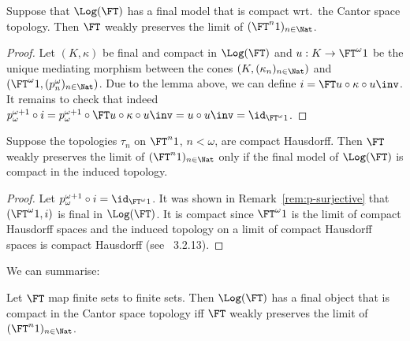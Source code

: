 \documentclass{entcs}
\begin{document}
\begin{prop}
  Suppose that $\Log(\FT)$ has a final model that is compact wrt.\ the
  Cantor space topology. Then $\FT$ weakly preserves the limit of
  $(\FT^n 1)_{n \in \Nat}$.
\end{prop}

\begin{proof}
  Let $(K,\kappa)$ be final and compact in $\Log(\FT)$ and $u: K \to
  \FT^{\omega} 1$ be the unique mediating morphism between the cones
  $(K, (\kappa_n)_{n \in \Nat})$ and $(\FT^{\omega} 1, (p^\omega_n)_{n
    \in \Nat})$. Due to the lemma above, we can define $i=\FT
  u\circ\kappa\circ u\inv$. It remains to check that indeed
  $p^{\omega+1}_{\omega}\circ i = p^{\omega+1}_{\omega}\circ \FT
  u\circ\kappa\circ u\inv = u\circ u\inv = \id_{\FT^\omega 1}$.
\end{proof}

\begin{prop}
  Suppose the topologies $\tau_n$ on $\FT^n 1$, $n<\omega$, are
  compact Hausdorff. Then $\FT$ weakly preserves the limit of $(\FT^n
  1)_{n \in \Nat}$ only if the final model of $\Log(\FT)$ is compact
  in the induced topology.
\end{prop}

\begin{proof}
Let $p^{\omega+1}_{\omega}\circ i = \id_{\FT^\omega 1}$.
It was shown in Remark~\ref{rem:p-surjective} that $(\FT^\omega 1,i)$
is final in $\Log(\FT)$. It is compact since $\FT^\omega 1$ is the
limit of compact Hausdorff spaces and the induced topology on a limit
of compact Hausdorff spaces is compact Hausdorff (see
\cite{engelking:gt}~3.2.13).
\end{proof}

We can summarise:

\begin{thm}
  Let $\FT$ map finite sets to finite sets. Then $\Log(\FT)$ has a
  final object that is compact in the Cantor space topology iff $\FT$
  weakly preserves the limit of $(\FT^n 1)_{n \in \Nat}$.
\end{thm}


\end{document}
